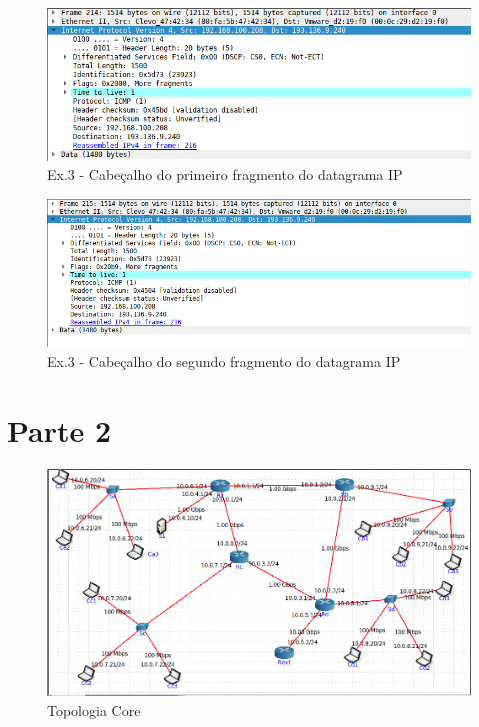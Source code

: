 \documentclass[a4paper]{report}
\begin{document}
\begin{figure}[H]
    \centering 
    \includegraphics[width=\textwidth]{images/fragmentDatagramaIpEx3.png}
    \caption{Ex.3 - Cabeçalho do primeiro fragmento do datagrama IP}
    \label{fig:fragmentDatagramaIpEx3}
\end{figure}

\begin{figure}[H]
    \centering 
    \includegraphics[width=\textwidth]{images/fragment2DatagramaIpEx3.png}
    \caption{Ex.3 - Cabeçalho do segundo fragmento do datagrama IP}
    \label{fig:fragment2DatagramaIpEx3}
\end{figure}

\chapter{Parte 2}

\begin{figure}[H]
    \centering 
    \includegraphics[width=\textwidth]{images/topologiaCore.png}
    \caption{Topologia Core}
    \label{fig:topologiaCore}
\end{figure}
\end{document}
